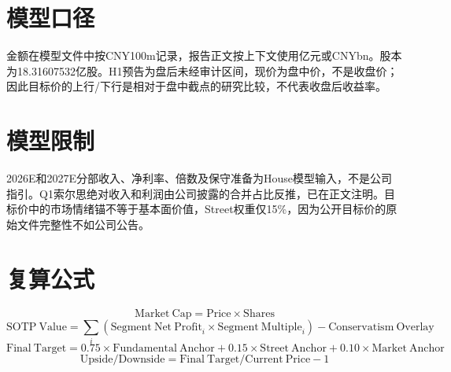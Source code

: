 
\section{模型口径}
金额在模型文件中按CNY100m记录，报告正文按上下文使用亿元或CNYbn。股本为18.31607532亿股。H1预告为盘后未经审计区间，现价为盘中价，不是收盘价；因此目标价的上行/下行是相对于盘中截点的研究比较，不代表收盘后收益率。

\section{模型限制}
2026E和2027E分部收入、净利率、倍数及保守准备为House模型输入，不是公司指引。Q1索尔思绝对收入和利润由公司披露的合并占比反推，已在正文注明。目标价中的市场情绪锚不等于基本面价值，Street权重仅15\%，因为公开目标价的原始文件完整性不如公司公告。

\section{复算公式}
\[
\mathrm{Market\ Cap}=\mathrm{Price}\times\mathrm{Shares}
\]
\[
\mathrm{SOTP\ Value}=\sum_i(\mathrm{Segment\ Net\ Profit}_i\times\mathrm{Segment\ Multiple}_i)-\mathrm{Conservatism\ Overlay}
\]
\[
\mathrm{Final\ Target}=0.75\times\mathrm{Fundamental\ Anchor}+0.15\times\mathrm{Street\ Anchor}+0.10\times\mathrm{Market\ Anchor}
\]
\[
\mathrm{Upside/Downside}=\mathrm{Final\ Target}/\mathrm{Current\ Price}-1
\]
